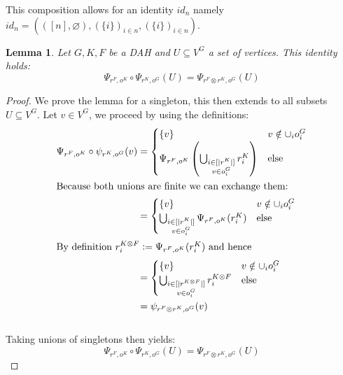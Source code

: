 \documentclass[12pt]{article}
\newtheorem{lemma}{Lemma}[section]
\newcommand{\defeq}{\vcentcolon=}
\newcommand{\1}{\mathbbm{1}}
\begin{document}
This composition allows for an identity $id_n$ namely $id_n = (([n], \varnothing), (\{i\})_{i\in n}, (\{i\})_{i\in n})$.\vspace{5pt}

\begin{lemma}\label{lem:psieq}
    Let $G,K,F$ be a DAH and $U\subseteq V^G$ a set of vertices. This identity holds:
    \[
        \Psi_{r^F, o^K}\circ \Psi_{r^K, o^G}(U) = \Psi_{r^F\otimes r^K, o^G}(U)
    \]
\end{lemma}

\begin{proof}
    We prove the lemma for a singleton, this then extends to all subsets $U\subseteq V^G$. Let $v\in V^G$, we proceed by using the definitions:
    \begin{align*}
        \Psi_{r^F, o^K}\circ \psi_{r^K, o^G}(v) &= 
        \begin{cases}
            \{v\} & v\notin \cup_i o_i^G\\
            \Psi_{r^F, o^K}\left(\bigcup_{\substack{i \in [|r^K|] \\ v \in o^G_i}} r^K_i\right) & \text{else}
        \end{cases}\\
        \intertext{Because both unions are finite we can exchange them: }
        &= 
        \begin{cases}
            \{v\} & v\notin \cup_i o_i^G\\
            \bigcup_{\substack{i \in [|r^K|] \\ v \in o^G_i}} \Psi_{r^F, o^K} (r^K_i) & \text{else}\\
        \end{cases}\\
        \intertext{By definition $r^{K\otimes F}_i \defeq \Psi_{r^F, o^K} (r^K_i)$ and hence}
        &=
        \begin{cases}
            \{v\} & v\notin \cup_i o_i^G\\
            \bigcup_{\substack{i \in [|r^{K\otimes F}|] \\ v \in o^G_i}} r^{K\otimes F}_i & \text{else}\\
        \end{cases}\\
        &= \psi_{r^F\otimes r^K, o^G}(v)
    \end{align*}\\

    Taking unions of singletons then yields:
    \[
        \Psi_{r^F, o^K}\circ \Psi_{r^K, o^G}(U) = \Psi_{r^F\otimes r^K, o^G}(U)
    \]
\end{proof}
\end{document}
